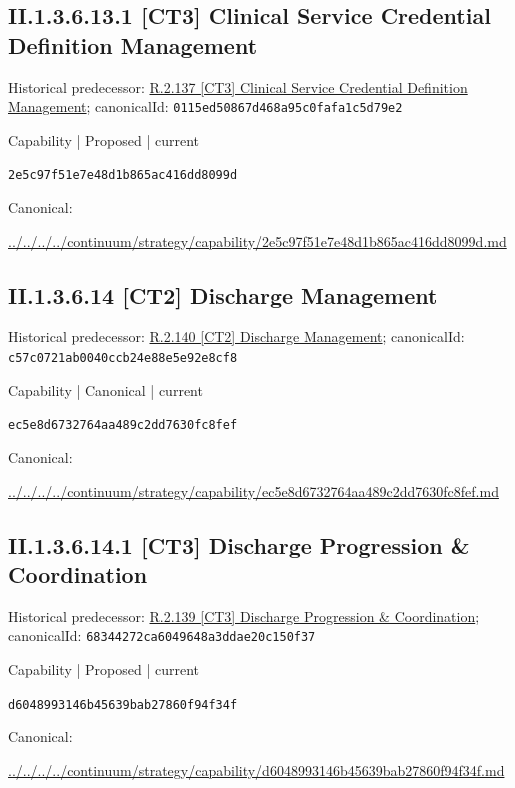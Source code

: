 \documentclass[10pt,a4paper]{article}
\begin{document}
\subsection*{II.1.3.6.13.1 [CT3] Clinical Service Credential Definition Management}
Historical predecessor: \hyperref[element-0115ed50867d468a95c0fafa1c5d79e2]{R.2.137 [CT3] Clinical Service Credential Definition Management}; canonicalId: \texttt{0115ed50867d468a95c0fafa1c5d79e2}\par
\label{element-2e5c97f51e7e48d1b865ac416dd8099d}
{\small Capability | Proposed | current}\par
\texttt{2e5c97f51e7e48d1b865ac416dd8099d}\par
Canonical: \par
{\footnotesize\url{../../../../continuum/strategy/capability/2e5c97f51e7e48d1b865ac416dd8099d.md}}\par
\subsection*{II.1.3.6.14 [CT2] Discharge Management}
Historical predecessor: \hyperref[element-c57c0721ab0040ccb24e88e5e92e8cf8]{R.2.140 [CT2] Discharge Management}; canonicalId: \texttt{c57c0721ab0040ccb24e88e5e92e8cf8}\par
\label{element-ec5e8d6732764aa489c2dd7630fc8fef}
{\small Capability | Canonical | current}\par
\texttt{ec5e8d6732764aa489c2dd7630fc8fef}\par
Canonical: \par
{\footnotesize\url{../../../../continuum/strategy/capability/ec5e8d6732764aa489c2dd7630fc8fef.md}}\par
\subsection*{II.1.3.6.14.1 [CT3] Discharge Progression \& Coordination}
Historical predecessor: \hyperref[element-68344272ca6049648a3ddae20c150f37]{R.2.139 [CT3] Discharge Progression \& Coordination}; canonicalId: \texttt{68344272ca6049648a3ddae20c150f37}\par
\label{element-d6048993146b45639bab27860f94f34f}
{\small Capability | Proposed | current}\par
\texttt{d6048993146b45639bab27860f94f34f}\par
Canonical: \par
{\footnotesize\url{../../../../continuum/strategy/capability/d6048993146b45639bab27860f94f34f.md}}\par
\end{document}
